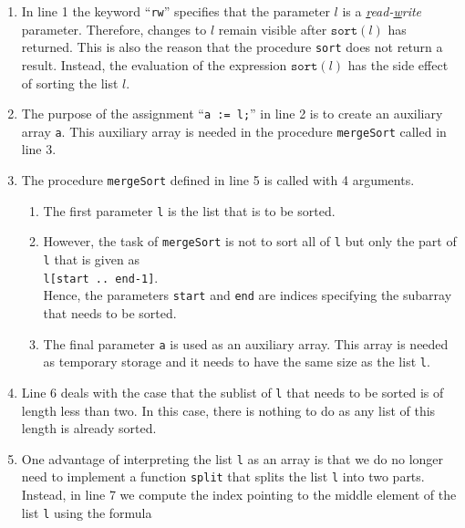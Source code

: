 \begin{enumerate}
\item In line 1 the keyword ``\texttt{rw}'' specifies that the parameter $l$ is a
      \emph{\underline{r}ead-\underline{w}rite} parameter.  Therefore, changes to $l$ remain
      visible after $\texttt{sort}(l)$ has returned.  This is also the reason that the procedure 
      \texttt{sort} does not return a result.  Instead, the evaluation of the expression
      $\mathtt{sort}(l)$ has the side effect of sorting the list $l$.
\item The purpose of the assignment ``\texttt{a := l;}'' in line 2 is to create an auxiliary array
      \texttt{a}.  This auxiliary array is needed in the procedure
      \texttt{mergeSort} called in line 3.
\item The procedure \texttt{mergeSort} defined in line 5 is called with 4 arguments.
      \begin{enumerate}
      \item The first parameter \texttt{l} is the list that is to be sorted.
      \item However, the task of \texttt{mergeSort} is not to sort all of \texttt{l} but only
            the part of \texttt{l} that is given as
            \\[0.2cm]
            \hspace*{1.3cm} 
            \texttt{l[start .. end-1]}. 
            \\[0.2cm]
            Hence, the parameters \texttt{start} and \texttt{end} are indices specifying the 
            subarray that needs to be sorted.
      \item The final parameter \texttt{a} is used as an auxiliary array.  This array is needed
            as temporary storage and it needs to have the same size as the list \texttt{l}.
      \end{enumerate} 
\item Line 6 deals with the case that the sublist of \texttt{l} that needs to be sorted is of length
      less than two.  In this case, there is nothing to do as any list of this length is already sorted.
\item One advantage of interpreting the list \texttt{l} as an array is that we do no longer
      need to implement a function \texttt{split} that splits the list \texttt{l} into two parts. 
      Instead, in line 7 we compute the index pointing to the middle element of the list \texttt{l} using the
      formula \\[0.2cm]
      \hspace*{1.3cm} 

\end{enumerate}
